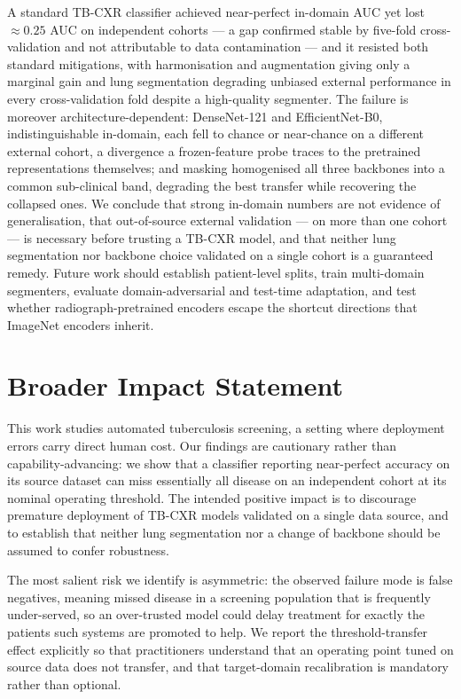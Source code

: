 \documentclass{article}
\begin{document}
A standard TB-CXR classifier achieved near-perfect in-domain AUC yet lost ${\approx}0.25$ AUC on
independent cohorts --- a gap confirmed stable by five-fold cross-validation and not attributable
to data contamination --- and it resisted both standard mitigations, with harmonisation and
augmentation giving only a marginal gain and lung segmentation degrading unbiased external
performance in every cross-validation fold despite a high-quality segmenter. The failure is
moreover architecture-dependent: DenseNet-121 and EfficientNet-B0, indistinguishable in-domain,
each fell to chance or near-chance on a different external cohort, a divergence a frozen-feature
probe traces to the pretrained representations themselves; and masking homogenised all three
backbones into a common sub-clinical band, degrading the best transfer while recovering the
collapsed ones. We conclude that strong in-domain numbers are not evidence of generalisation, that
out-of-source external validation --- on more than one cohort --- is necessary before trusting a
TB-CXR model, and that neither lung segmentation nor backbone choice validated on a single cohort
is a guaranteed remedy. Future work should establish patient-level splits, train multi-domain
segmenters, evaluate domain-adversarial and test-time adaptation, and test whether
radiograph-pretrained encoders escape the shortcut directions that ImageNet encoders inherit.

\section*{Broader Impact Statement}

This work studies automated tuberculosis screening, a setting where deployment errors carry direct
human cost. Our findings are cautionary rather than capability-advancing: we show that a classifier
reporting near-perfect accuracy on its source dataset can miss essentially all disease on an
independent cohort at its nominal operating threshold. The intended positive impact is to
discourage premature deployment of TB-CXR models validated on a single data source, and to
establish that neither lung segmentation nor a change of backbone should be assumed to confer
robustness.

The most salient risk we identify is asymmetric: the observed failure mode is false negatives,
meaning missed disease in a screening population that is frequently under-served, so an
over-trusted model could delay treatment for exactly the patients such systems are promoted to
help. We report the threshold-transfer effect explicitly so that practitioners understand that an
operating point tuned on source data does not transfer, and that target-domain recalibration is
mandatory rather than optional.
\end{document}
